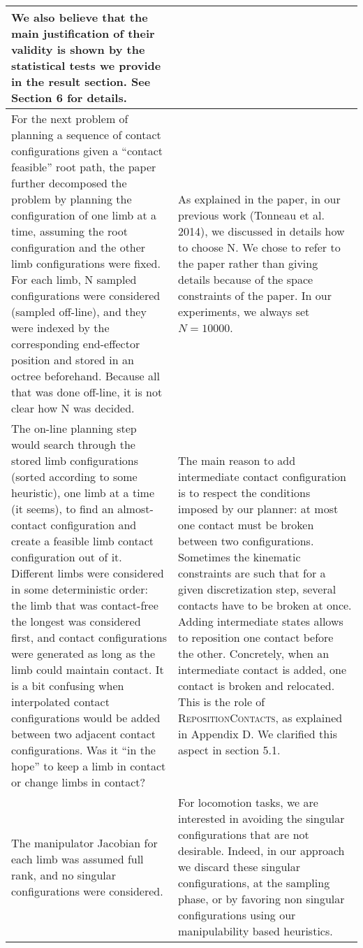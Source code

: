 \documentclass[a4paper]{article}
\begin{document}
\begin{longtable}{|p{21em}|p{21em}|}
We also believe that the main justification of their validity is shown by the statistical tests we provide in the result section.\newline
See Section 6 for details. 
\\ \hline %
For the next problem of planning a sequence of contact configurations given a “contact feasible” root path, the paper further decomposed the problem by planning the configuration of one limb at a time, assuming the root configuration and the other limb configurations were fixed. For each limb, N sampled configurations were considered (sampled off-line), and they were indexed by the corresponding end-effector position and stored in an octree beforehand. 
Because all that was done off-line, it is not clear how N was decided. 
&
As explained in the paper, in our previous work (Tonneau et al. 2014), we discussed in details  how to choose N. We chose to refer to the paper rather than giving details  because of the space constraints of
the paper. In our experiments,
we always set $N=10000$.

\\ \hline %
The on-line planning step would search through the stored limb configurations (sorted according to some heuristic), one limb at a time (it seems), to find an almost-contact configuration and create a feasible limb contact configuration out of it. Different limbs were considered in some deterministic order: the limb that was contact-free the longest was considered first, and contact configurations were generated as long as the limb could maintain contact.  It is a bit confusing when interpolated contact configurations would be added between two adjacent contact configurations. Was it “in the hope” to keep a limb in contact or change limbs in contact? 
& 
The main reason to add intermediate contact configuration
is to respect the conditions imposed by our planner: at most one contact must be broken between two configurations. Sometimes the kinematic constraints are such
that for a given discretization step, several contacts have to be broken at once. Adding intermediate states allows to reposition one contact before the other.
Concretely, when an intermediate contact is added, one contact is broken and relocated. This is the role of \textsc{RepositionContacts}, as explained in Appendix D. We clarified this aspect in section 5.1.

\\ \hline %
The manipulator Jacobian for each limb was assumed full rank, and no singular configurations were considered. 
&
For locomotion tasks, we are interested in avoiding the singular configurations that are not desirable.
Indeed, in our approach we discard these singular configurations, at the sampling phase, or by favoring non singular configurations
using our manipulability based heuristics.


\end{longtable}
\end{document}

